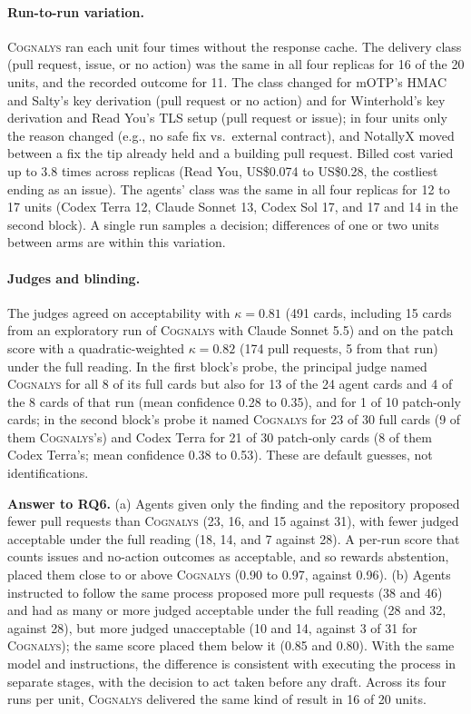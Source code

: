 \documentclass[conference]{IEEEtran}
\newcommand{\system}{\textsc{Cognalys}}
\newcommand{\researchq}[1]{\textbf{RQ#1}}
\begin{document}
\paragraph{Run-to-run variation.} \system{} ran each unit four times without the
response cache. The delivery class (pull request, issue, or no action) was the
same in all four replicas for 16 of the 20 units, and the recorded outcome for
11. The class changed for mOTP's HMAC and Salty's key derivation (pull request
or no action) and for Winterhold's key derivation and Read You's TLS setup (pull
request or issue); in four units only the reason changed (e.g., no safe fix vs.\
external contract), and NotallyX moved between a fix the tip already held and a
building pull request. Billed cost varied up to 3.8 times across replicas
(Read You, US\$0.074 to US\$0.28, the costliest ending as an issue).
The agents' class was the same in all four replicas for 12 to 17 units
(Codex Terra 12, Claude Sonnet 13, Codex Sol 17, and 17 and 14 in the second
block). A single run samples a
decision; differences of one or two units between arms are within this
variation.

\paragraph{Judges and blinding.} The judges agreed on acceptability with
$\kappa = 0.81$ (491 cards, including 15 cards from an exploratory run of
\system{} with Claude Sonnet 5.5) and on the patch score with a quadratic-weighted
$\kappa = 0.82$ (174 pull requests, 5 from that run) under the full reading. In
the first block's probe, the principal judge named \system{} for all 8 of its
full cards but also for 13 of the 24 agent cards and 4 of the 8 cards of that
run (mean confidence 0.28 to 0.35), and for 1 of 10 patch-only cards; in the
second block's probe it named \system{} for 23 of 30 full cards (9 of them
\system{}'s) and Codex Terra for 21 of 30 patch-only cards (8 of them Codex
Terra's; mean confidence 0.38 to 0.53). These are default guesses, not
identifications.

\textbf{Answer to \researchq{6}.} (a) Agents given only the finding and the
repository proposed fewer pull requests than \system{} (23, 16, and 15 against
31), with fewer judged acceptable under the full reading (18, 14, and 7 against
28). A per-run score that counts issues and no-action outcomes as acceptable,
and so rewards abstention, placed them close to or above \system{} (0.90 to
0.97, against 0.96). (b) Agents instructed to follow the same process proposed
more pull requests (38 and 46) and had as many or more judged acceptable under
the full reading (28 and 32, against 28), but more judged unacceptable (10 and
14, against 3 of 31 for \system{}); the same score placed them below it (0.85
and 0.80). With the same model and instructions, the difference is consistent
with executing the process in separate stages, with the decision to act taken
before any draft. Across its four runs per unit, \system{} delivered the same
kind of result in 16 of 20 units.
\end{document}
